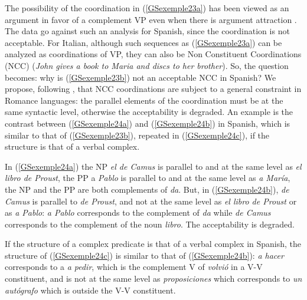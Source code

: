 \documentclass[output=paper
                ,modfonts
                ,nonflat
	        ,collection
	        ,collectionchapter
	        ,collectiontoclongg
 	        ,biblatex
                ,babelshorthands
                ,newtxmath
                ,draftmode
                ,colorlinks, citecolor=brown
]{./langsci/langscibook}
\begin{document}
{The possibility of the coordination in (\ref{GSexemple23a}) has been viewed as an argument in favor of a complement VP even when there is argument attraction \citep{andrews1999complex}. The data go against such an analysis for Spanish, since the coordination is not acceptable. For Italian, although such sequences as (\ref{GSexemple23a}) can be analyzed as coordinations of VP, they can also be Non Constituent Coordinations (NCC) (\textit{John gives a book to Maria and discs to her brother}). So, the question becomes: why is (\ref{GSexemple23b}) not an acceptable NCC in Spanish? We propose, following \citep{AG2010}, that NCC coordinations are subject to a general constraint in Romance languages: the parallel elements of the coordination must be at the same syntactic level, otherwise the acceptability is degraded. An example is the contrast between (\ref{GSexemple24a}) and (\ref{GSexemple24b}) in Spanish, which is similar to that of (\ref{GSexemple23b}), repeated in (\ref{GSexemple24c}), if the structure is that of a verbal complex.

\eal
{}
\label{GSexemple24} 
\label{GSexemple24a}
\label{GSexemple24b}
\label{GSexemple24c}
\zl

In (\ref{GSexemple24a}) the NP \textit{el de Camus} is parallel to and at the same level as \textit{el libro de Proust}, the PP a \textit{Pablo} is parallel to and at the same level as \textit{a Mar\'ia}, the NP and the PP are both complements of \textit{da}. But, in (\ref{GSexemple24b}), \textit{de Camus} is parallel to \textit{de Proust}, and not at the same level as \textit{el libro de Proust} or as \textit{a Pablo}: \textit{a Pablo} corresponds to the complement of \textit{da} while \textit{de Camus} corresponds to the complement of the noun \textit{libro}. The acceptability is degraded. 

If the structure of a complex predicate is that of a verbal complex in Spanish, the structure of (\ref{GSexemple24c}) is similar to that of (\ref{GSexemple24b}): \textit{a hacer} corresponds to a \textit{a pedir}, which is the complement V of \textit{volvi\'o} in a V-V constituent, and is not at the same level as \textit{proposiciones} which corresponds to \textit{un aut\'ografo} which is outside the V-V constituent.   

}
\end{document}
